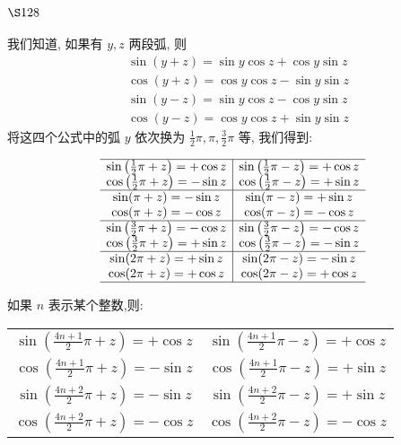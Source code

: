 \section{$\S 128$}

我们知道, 如果有 $y, z$ 两段弧, 则
\[
\begin{aligned}
& \sin (y+z)=\sin y \cos z+\cos y \sin z \\
& \cos (y+z)=\cos y \cos z-\sin y \sin z \\
& \sin (y-z)=\sin y \cos z-\cos y \sin z \\
& \cos (y-z)=\cos y \cos z+\sin y \sin z
\end{aligned}
\]
将这四个公式中的弧 $y$ 依次换为 $\frac{1}{2} \pi, \pi, \frac{3}{2} \pi$ 等, 我们得到:

\[
\begin{array}{c|c}
\hline \sin \left(\frac{1}{2} \pi+z\right)=+\cos z & \sin \left(\frac{1}{2} \pi-z\right)=+\cos z \\
\cos \left(\frac{1}{2} \pi+z\right)=-\sin z & \cos \left(\frac{1}{2} \pi-z\right)=+\sin z \\
\hline \sin (\pi+z)=-\sin z & \sin (\pi-z)=+\sin z \\
\cos (\pi+z)=-\cos z & \cos (\pi-z)=-\cos z \\
\hline \sin \left(\frac{3}{2} \pi+z\right)=-\cos z & \sin \left(\frac{3}{2} \pi-z\right)=-\cos z \\
\cos \left(\frac{3}{2} \pi+z\right)=+\sin z & \cos \left(\frac{3}{2} \pi-z\right)=-\sin z \\
\hline \sin (2 \pi+z)=+\sin z & \sin (2 \pi-z)=-\sin z \\
\cos (2 \pi+z)=+\cos z & \cos (2 \pi-z)=+\cos z \\
\hline
\end{array}
\]

如果 $n$ 表示某个整数,则:

\begin{tabular}{c|c}
\hline $\sin \left(\frac{4 n+1}{2} \pi+z\right)=+\cos z$ & $\sin \left(\frac{4 n+1}{2} \pi-z\right)=+\cos z$ \\
$\cos \left(\frac{4 n+1}{2} \pi+z\right)=-\sin z$ & $\cos \left(\frac{4 n+1}{2} \pi-z\right)=+\sin z$ \\
\hline $\sin \left(\frac{4 n+2}{2} \pi+z\right)=-\sin z$ & $\sin \left(\frac{4 n+2}{2} \pi-z\right)=+\sin z$ \\
$\cos \left(\frac{4 n+2}{2} \pi+z\right)=-\cos z$ & $\cos \left(\frac{4 n+2}{2} \pi-z\right)=-\cos z$ \\
\hline
\end{tabular}

